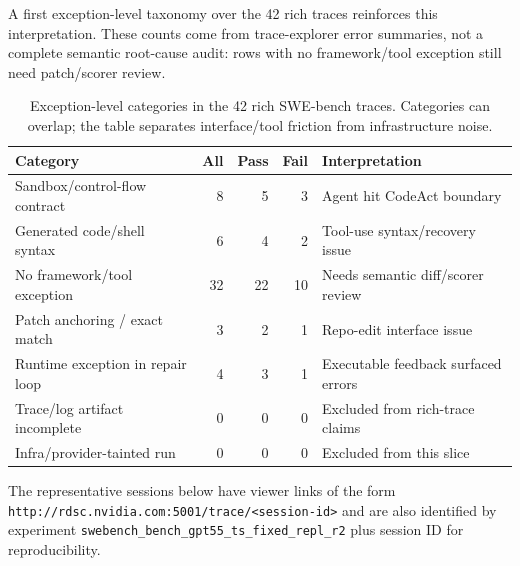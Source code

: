 \documentclass[11pt, logo, onecolumn, copyright, colorlinks=true, allcolors=blue]{nvidiatechreport}
\begin{document}
A first exception-level taxonomy over the 42 rich traces reinforces this
interpretation. These counts come from trace-explorer error summaries, not a
complete semantic root-cause audit: rows with no framework/tool exception still
need patch/scorer review.

\begin{table}[h]
\centering
\caption{Exception-level categories in the 42 rich SWE-bench traces. Categories
can overlap; the table separates interface/tool friction from infrastructure
noise.}
\label{tab:swebench-rich-taxonomy}
\begin{tabular}{lrrrl}
\toprule
\textbf{Category} & \textbf{All} & \textbf{Pass} & \textbf{Fail} & \textbf{Interpretation} \\
\midrule
Sandbox/control-flow contract & 8 & 5 & 3 & Agent hit CodeAct boundary \\
Generated code/shell syntax & 6 & 4 & 2 & Tool-use syntax/recovery issue \\
No framework/tool exception & 32 & 22 & 10 & Needs semantic diff/scorer review \\
Patch anchoring / exact match & 3 & 2 & 1 & Repo-edit interface issue \\
Runtime exception in repair loop & 4 & 3 & 1 & Executable feedback surfaced errors \\
Trace/log artifact incomplete & 0 & 0 & 0 & Excluded from rich-trace claims \\
Infra/provider-tainted run & 0 & 0 & 0 & Excluded from this slice \\
\bottomrule
\end{tabular}
\end{table}

The representative sessions below have viewer links of the form
\texttt{http://rdsc.nvidia.com:5001/trace/<session-id>} and are also identified
by experiment \texttt{swebench\_bench\_gpt55\_ts\_fixed\_repl\_r2} plus session
ID for reproducibility.
\end{document}
